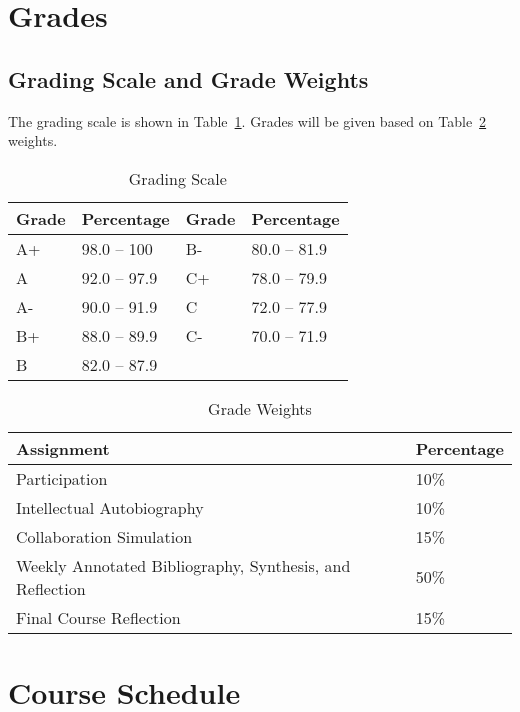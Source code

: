 \documentclass[12pt, letterpaper]{article}
\begin{document}
\section{Grades}

\subsection*{Grading Scale and Grade Weights}  
The grading scale is shown in Table~\ref{tab:grading-scale}. Grades will be given based on Table~\ref{tab:grade-weights} weights.

\begin{table}[ht]
\centering
\caption{Grading Scale}
\begin{tabular}{llll}
\toprule
\textbf{Grade} & \textbf{Percentage} & \textbf{Grade} & \textbf{Percentage} \\
\midrule
A+ & 98.0 – 100 & B- & 80.0 – 81.9\\
A & 92.0 – 97.9 & C+ & 78.0 – 79.9\\
A- & 90.0 – 91.9 & C & 72.0 – 77.9\\
B+ & 88.0 – 89.9 & C- & 70.0 – 71.9\\
B & 82.0 – 87.9 & & \\
\bottomrule
\end{tabular}
\label{tab:grading-scale}
\end{table}

\begin{table}[ht]
    \centering
    \caption{Grade Weights}
    \begin{tabular}{ll}
        \toprule
    \textbf{Assignment} & \textbf{Percentage} \\
    \midrule
    Participation & 10\% \\
    Intellectual Autobiography & 10\% \\
    Collaboration Simulation & 15\% \\
    Weekly Annotated Bibliography, Synthesis, and Reflection & 50\% \\
    Final Course Reflection & 15\% \\
    \bottomrule
    \end{tabular}
    \label{tab:grade-weights}
    \end{table}

\newpage

\section{Course Schedule}
\end{document}
